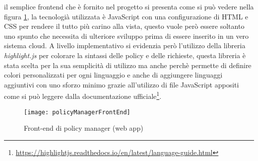 il semplice frontend che è fornito nel progetto si presenta come si può vedere nella figura \ref{fig:policyManagerFrontEnd}, la tecnologià utilizzata è JavaScript con una configurazione di HTML e CSS per rendere il tutto più carino alla vista, questo vuole però essere soltanto uno spunto che necessita di ulteriore sviluppo prima di essere inserito in un vero sistema cloud. A livello implementativo si evidenzia però l'utilizzo della libreria \emph{highlight.js}\cite{highlightjs} per colorare la sintassi delle policy e delle richieste, questa libreria è stata scelta per la sua semplicità di utilizzo ma anche perchè permette di definire colori personalizzati per ogni linguaggio e anche di aggiungere linguaggi aggiuntivi con uno sforzo minimo grazie all'utilizzo di file JavaScript appositi come si può leggere dalla documentazione ufficiale\footnote{\url{https://highlightjs.readthedocs.io/en/latest/language-guide.html}}.\medbreak
\begin{figure}[H]
    \begin{center}
    \texttt{[image: policyManagerFrontEnd]}
    \caption{Front-end di policy manager (web app)}
    \label{fig:policyManagerFrontEnd}
    \end{center}
\end{figure}


